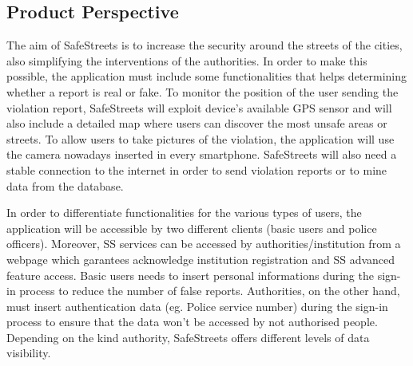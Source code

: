\subsection{Product Perspective}
The aim of SafeStreets is to increase the security around the streets of the cities, also simplifying the interventions of the authorities. \newline
In order to make this possible, the application must include some functionalities that helps determining whether a report is real or fake. \newline
To monitor the position of the user sending the violation report, SafeStreets will exploit device’s available GPS sensor and will also include a detailed map where users can discover the most unsafe areas or streets. \newline
To allow users to take pictures of the violation, the application will use the camera nowadays inserted in every smartphone. \newline
SafeStreets will also need a stable connection to the internet in order to send violation reports or to mine data from the database. \newline\par
In order to differentiate functionalities for the various types of users, the application will be accessible by two different clients (basic users and police officers). Moreover, SS services can be accessed by authorities/institution from a webpage which garantees acknowledge institution registration and SS advanced feature access.\newline
Basic users needs to insert personal informations during the sign-in process to reduce the number of false reports. \newline
Authorities, on the other hand, must insert authentication data (eg. Police service number) during the sign-in process to ensure that the data won’t be accessed by not authorised people. \newline
Depending on the kind authority, SafeStreets offers different levels of data visibility.

\newpage

